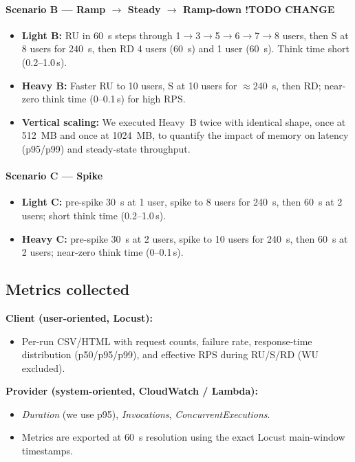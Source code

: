 \documentclass[11pt,a4paper]{article}
\begin{document}
\paragraph{Scenario B — Ramp $\rightarrow$ Steady $\rightarrow$ Ramp-down !TODO CHANGE}
\begin{itemize}
  \item \textbf{Light B:} RU in \SI{60}{s} steps through 1$\rightarrow$3$\rightarrow$5$\rightarrow$6$\rightarrow$7$\rightarrow$8 users, then S at 8 users for \SI{240}{s}, then RD 4 users (\SI{60}{s}) and 1 user (\SI{60}{s}). Think time short (0.2–1.0\,s).
  \item \textbf{Heavy B:} Faster RU to 10 users, S at 10 users for $\approx$\SI{240}{s}, then RD; near-zero think time (0–0.1\,s) for high RPS.
  \item \textbf{Vertical scaling:} We executed Heavy~B twice with identical shape, once at \SI{512}{MB} and once at \SI{1024}{MB}, to quantify the impact of memory on latency (p95/p99) and steady-state throughput.
\end{itemize}

\paragraph{Scenario C — Spike}
\begin{itemize}
  \item \textbf{Light C:} pre-spike \SI{30}{s} at 1 user, spike to 8 users for \SI{240}{s}, then \SI{60}{s} at 2 users; short think time (0.2–1.0\,s).
  \item \textbf{Heavy C:} pre-spike \SI{30}{s} at 2 users, spike to 10 users for \SI{240}{s}, then \SI{60}{s} at 2 users; near-zero think time (0–0.1\,s).
\end{itemize}

\subsection{Metrics collected}
\textbf{Client (user-oriented, Locust):}
\begin{itemize}
  \item Per-run CSV/HTML with request counts, failure rate, response-time distribution (p50/p95/p99), and effective RPS during RU/S/RD (WU excluded).
\end{itemize}
\textbf{Provider (system-oriented, CloudWatch / Lambda):}
\begin{itemize}
  \item \emph{Duration} (we use p95), \emph{Invocations}, \emph{ConcurrentExecutions}.
  \item Metrics are exported at \SI{60}{s} resolution using the exact Locust main-window timestamps.
\end{itemize}
\end{document}
